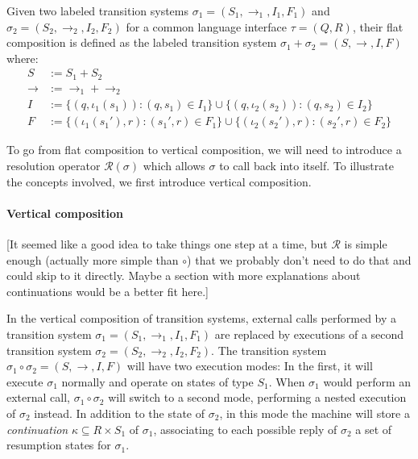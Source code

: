 \begin{definition}
Given two labeled transition systems
$\sigma_1 = (S_1, \rightarrow_1, I_1, F_1)$ and
$\sigma_2 = (S_2, \rightarrow_2, I_2, F_2)$
for a common language interface $\tau = (Q, R)$,
their flat composition is defined as
the labeled transition system
$\sigma_1 + \sigma_2 = (S, \rightarrow, I, F)$
where:
\begin{align*}
  S &:= S_1 + S_2 \\
  {\rightarrow} &:= {\rightarrow_1} + {\rightarrow_2} \\
  I &:= \{ (q, \iota_1(s_1)) : (q, s_1) \in I_1 \}
   \cup \{ (q, \iota_2(s_2)) : (q, s_2) \in I_2 \} \\
  F &:= \{ (\iota_1(s_1'), r) : (s_1', r) \in F_1 \}
   \cup \{ (\iota_2(s_2'), r) : (s_2', r) \in F_2 \}
\end{align*}
\end{definition}

To go from flat composition to vertical composition,
we will need to introduce a resolution operator $\mathcal{R}(\sigma)$
which allows $\sigma$ to call back into itself.
To illustrate the concepts involved,
we first introduce vertical composition.


\paragraph{Vertical composition} %

[It seemed like a good idea to take things one step at a time,
but $\mathcal{R}$ is simple enough (actually more simple than $\circ$)
that we probably don't need to do that and could skip to it directly.
Maybe a section with more explanations about continuations would
be a better fit here.]

In the vertical composition of transition systems,
external calls performed by a transition system
$\sigma_1 = (S_1, \rightarrow_1, I_1, F_1)$
are replaced by executions of a second transition system
$\sigma_2 = (S_2, \rightarrow_2, I_2, F_2)$.
The transition system
$\sigma_1 \circ \sigma_2 = (S, \rightarrow, I, F)$
will have two execution modes:
In the first,
it will execute $\sigma_1$ normally and
operate on states of type $S_1$.
When $\sigma_1$ would perform an external call,
$\sigma_1 \circ \sigma_2$ will switch to a second mode,
performing a nested execution of $\sigma_2$ instead.
In addition to the state of $\sigma_2$,
in this mode the machine will store a \emph{continuation}
$\kappa \subseteq R \times S_1$
of $\sigma_1$,
associating to each possible reply of $\sigma_2$
a set of resumption states for $\sigma_1$.

